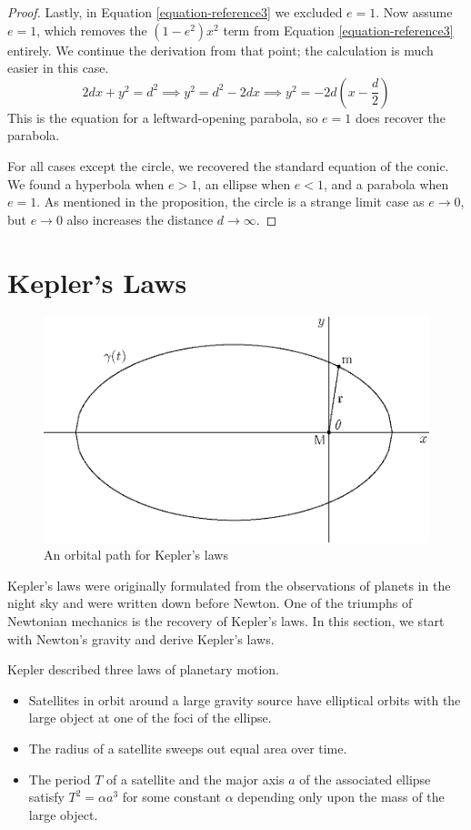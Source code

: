 \documentclass[fleqn,letterpaper]{report}
\begin{document}
\begin{proof}
Lastly, in Equation \ref{equation-reference3} we excluded $e = 1$. Now
assume $e=1$, which removes the $(1-e^2)x^2$ term from
Equation \ref{equation-reference3} entirely. We continue the
derivation from that point; the calculation is much easier in
this case. 
\begin{equation*}
2dx + y^2 = d^2 \implies
y^2 = d^2 - 2dx \implies
y^2 = -2d \left( x - \frac{d}{2} \right)
\end{equation*}
This is the equation for a leftward-opening parabola, so $e=1$
does recover the parabola. 

For all cases except the circle, we recovered the standard
equation of the conic. We found a hyperbola when $e>1$, an
ellipse when $e<1$, and a parabola when $e=1$. As mentioned in
the proposition, the circle is a strange limit case as $e
\rightarrow 0$, but $e \rightarrow 0$ also increases the
distance $d \rightarrow \infty$. 
\end{proof}

\section{Kepler's Laws}
\label{kepler}

\begin{figure}[t]
\centering
\includegraphics[width=12cm]{figure24.eps}
\caption{An orbital path for Kepler's laws}
\label{figure-keplers-laws}
\end{figure} 

Kepler's laws were originally formulated from the observations
of planets in the night sky and were written down before
Newton. One of the triumphs of Newtonian mechanics is the
recovery of Kepler's laws. In this section, we start with
Newton's gravity and derive Kepler's laws.

Kepler described three laws of planetary motion. 
\begin{itemize}
\item Satellites in orbit around a large gravity source have
elliptical orbits with the large object at one of the foci of
the ellipse.
\item The radius of a satellite sweeps out equal area over time.
\item The period $T$ of a satellite and the major axis $a$ of the
associated ellipse satisfy $T^2 = \alpha a^3$ for some
constant $\alpha$ depending only upon the mass of the large object.
\end{itemize}
\end{document}
